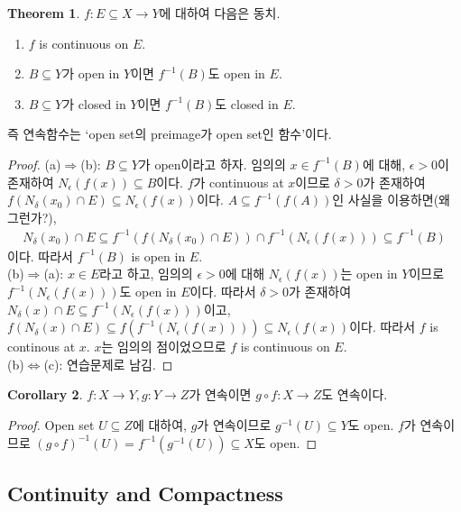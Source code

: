 \documentclass[12pt]{article}
\theoremstyle{definition}
\newtheorem{thm}{Theorem}[section]
\newtheorem{cor}[thm]{Corollary}
\def\eps{\epsilon}
\begin{document}
\begin{thm} \label{conti}
	\(f: E \subseteq X \rightarrow Y\)에 대하여 다음은 동치.
	\begin{enumerate}[label=(\alph*), leftmargin=2\parindent]
		\item
		\(f\) is continuous on \(E\).
		\item
		\(B \subseteq Y\)가 open in \(Y\)이면 \(f^{-1}(B)\)도 open in \(E\).
		\item
		\(B \subseteq Y\)가 closed in \(Y\)이면 \(f^{-1}(B)\)도 closed in \(E\).
	\end{enumerate}
	즉 연속함수는 `open set의 preimage가 open set인 함수'이다.
\end{thm}
\begin{proof}
	(a)$\Rightarrow$(b): \(B \subseteq Y\)가 open이라고 하자. 임의의 \(x \in f^{-1}(B)\)에 대해, \(\eps > 0\)이 존재하여 \(N_\eps (f(x)) \subseteq B\)이다. \(f\)가 continuous at \(x\)이므로 \(\delta > 0\)가 존재하여 \(f(N_\delta (x_0) \cap E) \subseteq N_\eps (f(x))\)이다. \(A \subseteq f^{-1}(f(A))\)인 사실을 이용하면(왜 그런가?),
	\begin{gather*}
		N_\delta (x_0) \cap E \subseteq f^{-1}(f(N_\delta (x_0) \cap E)) \cap f^{-1}(N_\eps (f(x))) \subseteq f^{-1}(B)
	\end{gather*}
	이다. 따라서 \(f^{-1}(B)\) is open in \(E\).\\
	(b)$\Rightarrow$(a): \(x \in E\)라고 하고, 임의의 \(\eps > 0\)에 대해 \(N_\eps (f(x))\)는 open in \(Y\)이므로 \(f^{-1}(N_\eps (f(x)))\)도 open in \(E\)이다. 따라서 \(\delta > 0\)가 존재하여 \(N_\delta (x) \cap E \subseteq f^{-1}(N_\eps (f(x)))\)이고, \(f(N_\delta (x) \cap E) \subseteq f(f^{-1}(N_\eps (f(x)))) \subseteq N_\eps (f(x))\)이다. 따라서 \(f\) is continous at \(x\). \(x\)는 임의의 점이었으므로 \(f\) is continuous on \(E\).\\
	(b)$\Leftrightarrow$(c): 연습문제로 남김.
\end{proof}

\begin{cor}
	\(f: X \rightarrow Y, g: Y \rightarrow Z\)가 연속이면 \(g \circ f: X \rightarrow Z\)도 연속이다.
\end{cor}
\begin{proof}
	Open set \(U \subseteq Z\)에 대하여, \(g\)가 연속이므로 \(g^{-1}(U) \subseteq Y\)도 open. \(f\)가 연속이므로 \((g \circ f)^{-1}(U) = f^{-1}(g^{-1}(U)) \subseteq X\)도 open.
\end{proof}

\subsection{Continuity and Compactness} \label{sec cont cpt}
\end{document}
